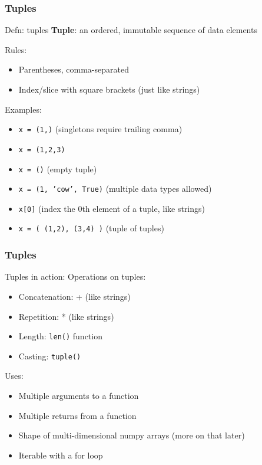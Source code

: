 \documentclass{beamer}
\newcommand{\code}[1]{\texttt{#1}}
\begin{document}
\begin{frame}	
	\frametitle{Tuples}
	
	\begin{alertblock}{Defn: tuples}
		\textbf{Tuple}: an ordered, immutable sequence of data elements
		
		\vspace{10pt}
		Rules:
		\begin{itemize}
			\item Parentheses, comma-separated
			\item Index/slice with square brackets (just like strings)
		\end{itemize}
		
		\vspace{10pt}
		Examples:
		\begin{itemize}
			\item \code{x = (1,)} (singletons require trailing comma)
			\item \code{x = (1,2,3)}
			\item \code{x = ()} (empty tuple)
			\item \code{x = (1, 'cow', True)} (multiple data types allowed)
			\item \code{x[0]} (index the 0th element of a tuple, like strings)
			\item \code{x = ( (1,2), (3,4) )} (tuple of tuples)
		\end{itemize}
	\end{alertblock}
	
\end{frame}

\begin{frame}	
	\frametitle{Tuples}
	
	\begin{block}{Tuples in action:}
		Operations on tuples:
		\begin{itemize}
			\item Concatenation: + (like strings)
			\item Repetition: * (like strings)
			\item Length: \code{len()} function
			\item Casting: \code{tuple()}
		\end{itemize}
		
		\vspace{10pt}
		Uses:
		\begin{itemize}
			\item Multiple arguments to a function
			\item Multiple returns from a function
			\item Shape of multi-dimensional numpy arrays (more on that later)
			\item Iterable with a for loop
		\end{itemize}
	\end{block}
	
\end{frame}
\end{document}
